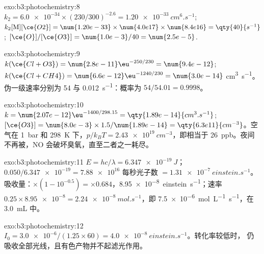 \begin{solution}{exo:b3:photochemistry:8}
$k_2 = \num{6.0e-34} \times (230/300)^{-2.6} = \qty{1.20e-33}{cm^6.s^{-1}}$; $k_2[\mathrm M][\ce{O2}] = \num{1.20e-33} \times
\num{4.0e17} \times \num{8.4e16} = \qty{40}{s^{-1}}$; $[\ce{O}]/[\ce{O3}] = \num{1.0e-3}/40 = \num{2.5e-5}$.
\end{solution}

\begin{solution}{exo:b3:photochemistry:9}
$k(\ce{Cl + O3}) = \num{2.8e-11}\eu^{-250/230} = \num{9.4e-12}$; $k(\ce{Cl + CH4}) = \num{6.6e-12}\eu^{-1240/230} = \num{3.0e-14}$
\unit{cm^3.s^{-1}}。伪一级速率分别为 54 与 \qty{0.012}{s^{-1}}：概率为 $54/54.01 = 0.9998$。
\end{solution}

\begin{solution}{exo:b3:photochemistry:10}
$k = \num{2.07e-12}\eu^{-1400/298.15} = \qty{1.89e-14}{cm^3.s^{-1}}$; $[\ce{O3}] = \num{8.0e-3} \times 1.5/\num{1.89e-14} =
\qty{6.3e11}{cm^{-3}}$。空气在 \qty{1}{bar} 和 \qty{298}{K} 下，$p/k_BT = \qty{2.43e19}{cm^{-3}}$，即相当于 \qty{26}{ppb}。夜间
 不再被，NO 会破坏臭氧，直至二者之一耗尽。
\end{solution}

\begin{solution}{exo:b3:photochemistry:11}
$E = hc/\lambda = \qty{6.347e-19}{J}$；$0.050/\num{6.347e-19} = \num{7.88e16}$ 每秒光子数 $= \qty{1.31e-7}{einstein.s^{-1}}$。
吸收量：$\times(1 - 10^{-0.5}) = \times0.684$，\qty{8.95e-8}{einstein.s^{-1}}；速率 $0.25 \times \num{8.95e-8} =
\qty{2.24e-8}{mol.s^{-1}}$，即 \qty{7.5e-6}{mol.L^{-1}.s^{-1}}，在 \qty{3.0}{mL} 中。
\end{solution}

\begin{solution}{exo:b3:photochemistry:12}
$I_0 = \num{3.0e-6}/(1.25 \times 60) = \qty{4.0e-8}{einstein.s^{-1}}$。转化率较低时，
仍吸收全部光线，且有色产物并不起滤光作用。
\end{solution}

